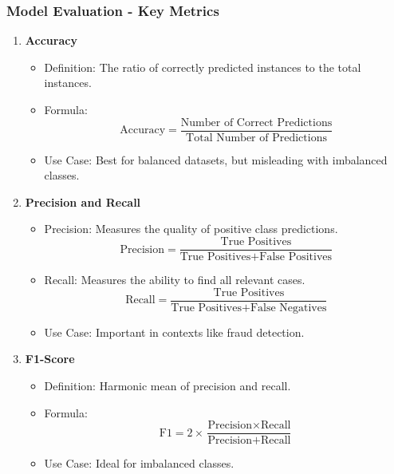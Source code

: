 \documentclass[aspectratio=169]{beamer}
\begin{document}
\begin{frame}[fragile]
    \frametitle{Model Evaluation - Key Metrics}
    \begin{enumerate}
        \item \textbf{Accuracy}
            \begin{itemize}
                \item Definition: The ratio of correctly predicted instances to the total instances.
                \item Formula: 
                \[
                \text{Accuracy} = \frac{\text{Number of Correct Predictions}}{\text{Total Number of Predictions}}
                \]
                \item Use Case: Best for balanced datasets, but misleading with imbalanced classes.
            \end{itemize}
        
        \item \textbf{Precision and Recall}
            \begin{itemize}
                \item Precision: Measures the quality of positive class predictions.
                \[
                \text{Precision} = \frac{\text{True Positives}}{\text{True Positives} + \text{False Positives}}
                \]
                \item Recall: Measures the ability to find all relevant cases.
                \[
                \text{Recall} = \frac{\text{True Positives}}{\text{True Positives} + \text{False Negatives}}
                \]
                \item Use Case: Important in contexts like fraud detection.
            \end{itemize}
            
        \item \textbf{F1-Score}
            \begin{itemize}
                \item Definition: Harmonic mean of precision and recall.
                \item Formula:
                \[
                \text{F1} = 2 \times \frac{\text{Precision} \times \text{Recall}}{\text{Precision} + \text{Recall}}
                \]
                \item Use Case: Ideal for imbalanced classes.
            \end{itemize}
    \end{enumerate}

\end{frame}
\end{document}
